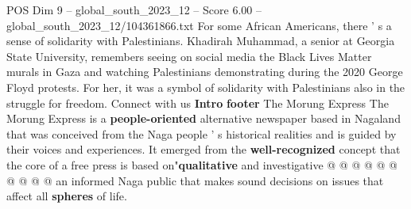\begin{textsample}{POS Dim 9 – global\_south\_2023\_12 – Score 6.00 – global\_south\_2023\_12/104361866.txt}
For some African Americans, there ' s a sense of solidarity with Palestinians.
Khadirah Muhammad, a senior at Georgia State University, remembers seeing on social media the Black Lives Matter murals in Gaza and watching Palestinians demonstrating during the 2020 George Floyd protests.
For her, it was a symbol of solidarity with Palestinians also in the struggle for freedom.
Connect with us \textbf{Intro} \textbf{footer} The Morung Express The Morung Express is a \textbf{people-oriented} alternative newspaper based in Nagaland that was conceived from the Naga people ' s historical realities and is guided by their voices and experiences.
It emerged from the \textbf{well-recognized} concept that the core of a free press is based on"\textbf{qualitative} and investigative @ @ @ @ @ @ @ @ @ @ an informed Naga public that makes sound decisions on issues that affect all \textbf{spheres} of life.

\end{textsample}
